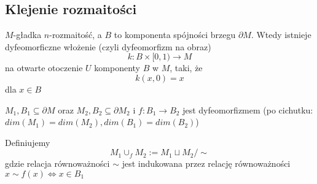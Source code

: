 \subsection{Klejenie rozmaitości}



\begin{theorem}
$M$-gładka $n$-rozmaitość, a $B$ to komponenta spójności brzegu $\partial M$. Wtedy istnieje dyfeomorficzne włożenie (czyli dyfeomorfizm na obraz)
$$k:B\times[0,1)\to M$$
na otwarte otoczenie $U$ komponenty $B$ w $M$, taki, że
$$k(x,0)=x$$
dla $x\in B$
\end{theorem}

\begin{definition}
$M_1,B_1\subseteq\partial M$ oraz $M_2,B_2\subseteq\partial M_2$ i $f:B_1\to B_2$ jest dyfeomorfizmem (po cichutku: $dim(M_1)=dim(M_2),dim(B_1)=dim(B_2)$)

Definiujemy
$$M_1\cup_f M_2:=M_1\sqcup M_2/\sim$$
gdzie relacja równoważności $\sim$ jest indukowana przez relację równoważności $x\sim f(x)\iff x\in B_1$
\end{definition}





















